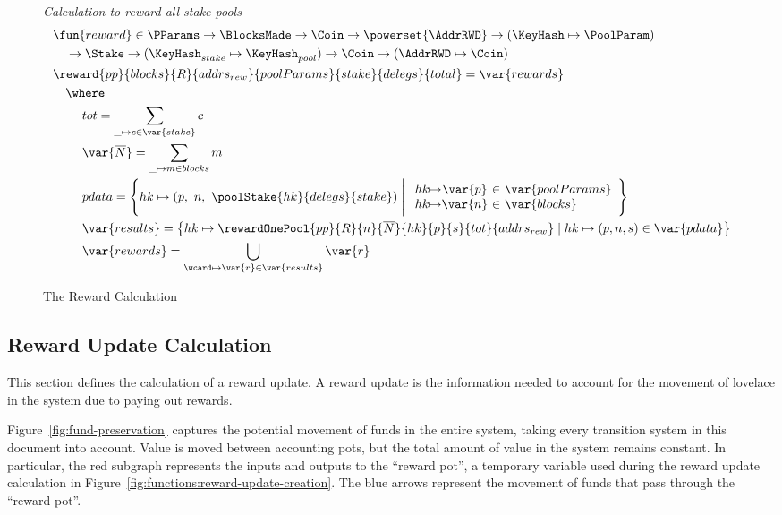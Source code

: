 \begin{figure}[htb]
  \emph{Calculation to reward all stake pools}
  \begin{align*}
      & \fun{reward} \in \PParams \to \BlocksMade \to \Coin\to \powerset{\AddrRWD}
      \to (\KeyHash \mapsto \PoolParam) \\
      & ~~~\to \Stake \to (\KeyHash_{stake} \mapsto \KeyHash_{pool}) \to
      \Coin \to (\AddrRWD \mapsto \Coin)\\
      & \reward{pp}{blocks}{R}{addrs_{rew}}{poolParams}{stake}{delegs}{total}
          = \var{rewards}\\
      & ~~~\where \\
      & ~~~~~~~tot = \sum_{\_\mapsto c\in \var{stake}}c \\
      & ~~~~~~~\var{\overline{N}} = \sum_{\_\mapsto m\in blocks}m \\
      & ~~~~~~~pdata = \left\{
        hk\mapsto \left(p,~n,~\poolStake{hk}{delegs}{stake}\right)
        \mathrel{\Bigg|}
        \begin{array}{r@{\mapsto}c@{~\in~}l}
          hk & \var{p} & \var{poolParams} \\
          hk & \var{n} & \var{blocks} \\
        \end{array}
      \right\} \\
      & ~~~~~~~\var{results} = \left\{
        hk \mapsto \rewardOnePool{pp}{R}{n}{\overline{N}}{hk}{p}{s}{tot}{addrs_{rew}}
                 \mid
        hk\mapsto(p, n, s)\in\var{pdata} \right\} \\
      & ~~~~~~~\var{rewards} = \bigcup_{\wcard\mapsto\var{r}\in\var{results}}\var{r}
  \end{align*}
  \caption{The Reward Calculation}
  \label{fig:functions:reward-calc}
\end{figure}

\clearpage

\subsection{Reward Update Calculation}
\label{sec:reward-calc}

This section defines the calculation of a reward update.
A reward update is the information needed to account for the movement of lovelace
in the system due to paying out rewards.

Figure~\ref{fig:fund-preservation} captures the potential movement of funds in the entire system,
taking every transition system in this document into account.  Value is moved between
accounting pots, but the total amount of value in the system remains constant.
In particular, the red subgraph represents the inputs and outputs to
the ``reward pot'', a temporary variable used during the reward update calculation in
Figure~\ref{fig:functions:reward-update-creation}.
The blue arrows represent the movement of funds that pass through the ``reward pot''.


